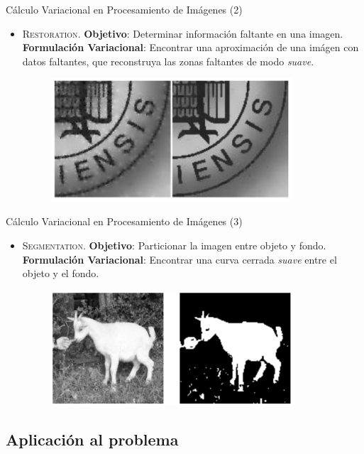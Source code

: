 \documentclass{beamer}
\begin{document}
\begin{frame}{Cálculo Variacional en Procesamiento de Imágenes (2)}
\begin{itemize}
  \item \textsc{Restoration}. \textbf{Objetivo}: Determinar información faltante en una imagen. \textbf{Formulación Variacional}: Encontrar una aproximación de una imágen con datos faltantes, que reconstruya las zonas faltantes de modo \textit{suave}.
  \begin{figure}[htpb!]
  \centering
  \includegraphics[width=9cm]{restoration}
  \end{figure}
\end{itemize}
\end{frame}

\begin{frame}{Cálculo Variacional en Procesamiento de Imágenes (3)}
  \begin{itemize}
      \item \textsc{Segmentation}. \textbf{Objetivo}: Particionar la imagen entre objeto y fondo. \textbf{Formulación Variacional}: Encontrar una curva cerrada \textit{suave} entre el objeto y el fondo.
    \begin{figure}[htpb!]
  \centering
  \includegraphics[width=9cm]{segmentation}
  \end{figure}
  \end{itemize}
\end{frame}


\subsection{Aplicación al problema}
\end{document}
